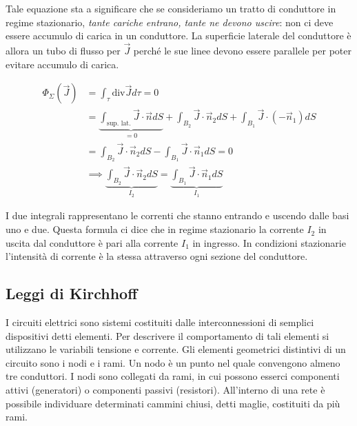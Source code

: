 \begin{figure}[htpb]
\end{figure}
\FloatBarrier

Tale equazione sta a significare che se consideriamo un tratto di conduttore in regime stazionario, \emph{tante cariche entrano, tante ne devono uscire}: non ci deve essere accumulo di carica in un conduttore. La superficie laterale del conduttore è allora un tubo di flusso per $\vec{J}$ perché le sue linee devono essere parallele per poter evitare accumulo di carica.

\begin{align*}
	\Phi_{\Sigma}(\vec{J}) &= \int_{\tau}\text{div}\vec{J} d\tau = 0 \\
	&= \underbrace{\int_{\text{sup. lat.}}\vec{J} \cdot \vec{n} dS}_{=0} +\int_{B_2}\vec{J} \cdot \vec{n}_2 dS + \int_{B_1}\vec{J} \cdot (-\vec{n}_1 ) dS \\
	&= \int_{B_2}\vec{J} \cdot \vec{n}_2 dS - \int_{B_1}\vec{J} \cdot \vec{n}_1 dS = 0\\
	&\implies \underbrace{\int_{B_2}\vec{J} \cdot \vec{n}_2 dS}_{I_2} = \underbrace{\int_{B_1}\vec{J} \cdot \vec{n}_1 dS}_{I_1}
\end{align*}

I due integrali rappresentano le correnti che stanno entrando e uscendo dalle basi uno e due. Questa formula ci dice che in regime stazionario la corrente $I_2$ in uscita dal conduttore è pari alla corrente $I_1$ in ingresso.
In condizioni stazionarie l'intensità di corrente è la stessa attraverso ogni sezione del conduttore.

\subsection{Leggi di Kirchhoff}

I circuiti elettrici sono sistemi costituiti dalle interconnessioni di semplici dispositivi detti elementi. Per descrivere il comportamento di tali elementi si utilizzano le variabili tensione e corrente. Gli elementi geometrici distintivi di un circuito sono i nodi e i rami. Un nodo è un punto nel quale convengono almeno tre conduttori. I nodi sono collegati da rami, in cui possono esserci componenti attivi (generatori) o componenti passivi (resistori). All'interno di una rete è possibile individuare determinati cammini chiusi, detti maglie, costituiti da più rami.

